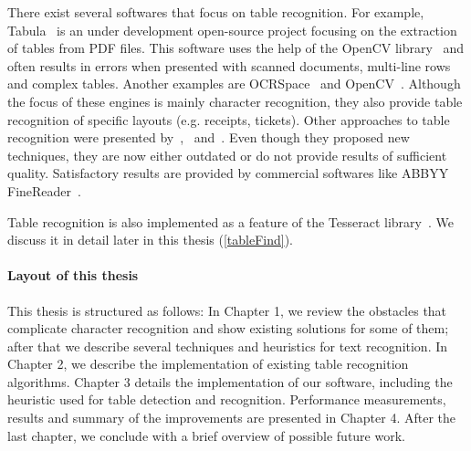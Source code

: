 There exist several softwares that focus on table recognition. For example, Tabula~\cite{Tabula} is an under development open-source project focusing on the extraction of tables from PDF files. This software uses the help of the OpenCV library~\cite{OpenCV} and often results in errors when presented with scanned documents, multi-line rows and complex tables. Another examples are OCRSpace~\cite{OCRSpace} and OpenCV~\cite{OpenCV}. Although the focus of these engines is mainly character recognition, they also provide table recognition of specific layouts (e.g. receipts, tickets). Other approaches to table recognition were presented by~\citet{pdf2table},~\citet{TRecs} and~\citet{MediumTable}. Even though they proposed new techniques, they are now either outdated or do not provide results of sufficient quality. Satisfactory results are provided by commercial softwares like ABBYY FineReader~\cite{ABBYYdpi}.

Table recognition is also implemented as a feature of the Tesseract library~\cite{tableDetHeterogeneous}. We discuss it in detail later in this thesis (\cref{tableFind}).

\paragraph{Layout of this thesis} This thesis is structured as follows: In Chapter 1, we review the obstacles that complicate character recognition and show existing solutions for some of them; after that we describe several techniques and heuristics for text recognition. In Chapter 2, we describe the implementation of existing table recognition algorithms. Chapter 3 details the implementation of our software, including the heuristic used for table detection and recognition. Performance measurements, results and summary of the improvements are presented in Chapter 4. After the last chapter, we conclude with a brief overview of possible future work.
